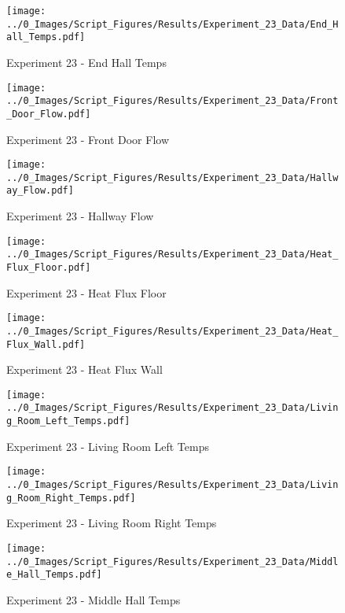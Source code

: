 	\clearpage

	\begin{figure}[H]
		\centering
		\texttt{[image: ../0\_Images/Script\_Figures/Results/Experiment\_23\_Data/End\_Hall\_Temps.pdf]}
		\caption[]{Experiment 23 - End Hall Temps}
	\end{figure}
 

	\begin{figure}[H]
		\centering
		\texttt{[image: ../0\_Images/Script\_Figures/Results/Experiment\_23\_Data/Front\_Door\_Flow.pdf]}
		\caption[]{Experiment 23 - Front Door Flow}
	\end{figure}
 
	\clearpage

	\begin{figure}[H]
		\centering
		\texttt{[image: ../0\_Images/Script\_Figures/Results/Experiment\_23\_Data/Hallway\_Flow.pdf]}
		\caption[]{Experiment 23 - Hallway Flow}
	\end{figure}
 

	\begin{figure}[H]
		\centering
		\texttt{[image: ../0\_Images/Script\_Figures/Results/Experiment\_23\_Data/Heat\_Flux\_Floor.pdf]}
		\caption[]{Experiment 23 - Heat Flux Floor}
	\end{figure}
 
	\clearpage

	\begin{figure}[H]
		\centering
		\texttt{[image: ../0\_Images/Script\_Figures/Results/Experiment\_23\_Data/Heat\_Flux\_Wall.pdf]}
		\caption[]{Experiment 23 - Heat Flux Wall}
	\end{figure}
 

	\begin{figure}[H]
		\centering
		\texttt{[image: ../0\_Images/Script\_Figures/Results/Experiment\_23\_Data/Living\_Room\_Left\_Temps.pdf]}
		\caption[]{Experiment 23 - Living Room Left Temps}
	\end{figure}
 
	\clearpage

	\begin{figure}[H]
		\centering
		\texttt{[image: ../0\_Images/Script\_Figures/Results/Experiment\_23\_Data/Living\_Room\_Right\_Temps.pdf]}
		\caption[]{Experiment 23 - Living Room Right Temps}
	\end{figure}
 

	\begin{figure}[H]
		\centering
		\texttt{[image: ../0\_Images/Script\_Figures/Results/Experiment\_23\_Data/Middle\_Hall\_Temps.pdf]}
		\caption[]{Experiment 23 - Middle Hall Temps}
	\end{figure}
 
